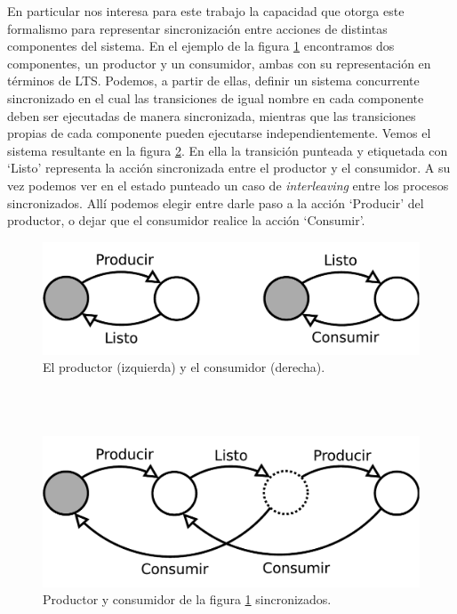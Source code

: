 \documentclass[titlepage, 12pt]{book}
\begin{document}
En particular nos interesa para este trabajo la capacidad que otorga este formalismo para representar sincronizaci\'on entre acciones de distintas componentes del sistema. En el ejemplo de la figura \ref{figura1} encontramos dos componentes, un productor y un consumidor, ambas con su representaci\'on en t\'erminos de LTS. Podemos, a partir de ellas, definir un sistema concurrente sincronizado en el cual las transiciones de igual nombre en cada componente deben ser ejecutadas de manera sincronizada, mientras que las transiciones propias de cada componente pueden ejecutarse independientemente. Vemos el sistema resultante en la figura \ref{figura2}. En ella la transici\'on punteada y etiquetada con `Listo' representa la acci\'on sincronizada entre el productor y el consumidor. A su vez podemos ver en el estado punteado un caso de \emph{interleaving} entre los procesos sincronizados. All\'i podemos elegir entre darle paso a la acci\'on `Producir' del productor, o dejar que el consumidor realice la acci\'on `Consumir'. 

\begin{figure}[htp] %
  \centering
    \includegraphics[scale=0.75]{Imagenes/prodYcons.pdf}
  \caption{El productor (izquierda) y el consumidor (derecha).}
  \label{figura1}
\end{figure}
~\\\\

\begin{figure}[htp] %
  \centering
    \includegraphics[scale=0.75]{Imagenes/prodYconsSincro.pdf}
  \caption{Productor y consumidor de la figura \ref{figura1} sincronizados.}
  \label{figura2}
\end{figure}
\end{document}
